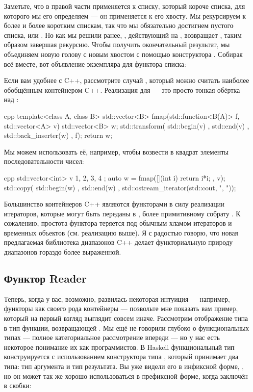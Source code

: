 Заметьте, что в правой части  применяется к списку, который короче списка, для которого мы его определяем — он применяется к его хвосту. Мы рекурсируем к более и более коротким спискам, так что мы обязательно достигнем пустого списка, или . Но как мы решили ранее, , действующий на , возвращает , таким образом завершая рекурсию. Чтобы получить окончательный результат, мы объединяем новую голову  с новым хвостом  с помощью конструктора . Собирая всё вместе, вот объявление экземпляра для функтора списка:

Если вам удобнее с C++, рассмотрите случай , который можно считать наиболее обобщённым контейнером C++. Реализация  для  — это просто тонкая обёртка над :

\begin{snip}{cpp}
template<class A, class B>
std::vector<B> fmap(std::function<B(A)> f, std::vector<A> v) {
    std::vector<B> w;
    std::transform( std::begin(v)
                  , std::end(v)
                  , std::back_inserter(w)
                  , f);
    return w;
}
\end{snip}
Мы можем использовать её, например, чтобы возвести в квадрат элементы последовательности чисел:

\begin{snip}{cpp}
std::vector<int> v{ 1, 2, 3, 4 };
auto w = fmap([](int i) { return i*i; }, v);
std::copy( std::begin(w)
         , std::end(w)
         , std::ostream_iterator(std::cout, ", "));
\end{snip}
Большинство контейнеров C++ являются функторами в силу реализации итераторов, которые могут быть переданы в , более примитивному собрату . К сожалению, простота функтора теряется под обычным хламом итераторов и временных объектов (см. реализацию  выше). Я с радостью говорю, что новая предлагаемая библиотека диапазонов C++ делает функториальную природу диапазонов гораздо более выраженной.

\subsection{Функтор Reader}

Теперь, когда у вас, возможно, развилась некоторая интуиция — например, функторы как своего рода контейнеры — позвольте мне показать вам пример, который на первый взгляд выглядит совсем иначе. Рассмотрим отображение типа  в тип функции, возвращающей . Мы ещё не говорили глубоко о функциональных типах — полное категориальное рассмотрение впереди — но у нас есть некоторое понимание их как программистов. В Haskell функциональный тип конструируется с использованием конструктора типа \code{(->)}, который принимает два типа: тип аргумента и тип результата. Вы уже видели его в инфиксной форме, , но он может так же хорошо использоваться в префиксной форме, когда заключён в скобки:

